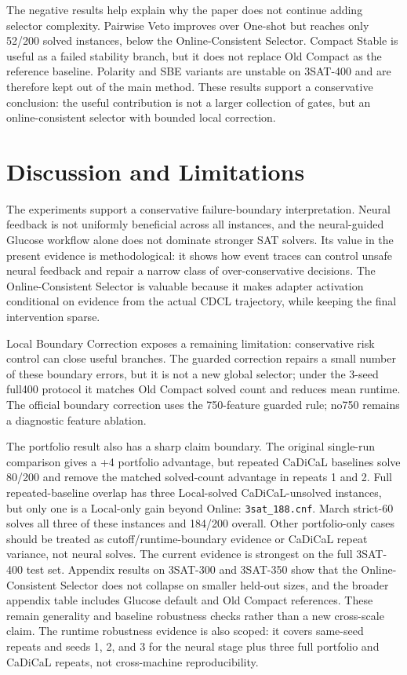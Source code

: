 \documentclass[11pt]{article}
\begin{document}
The negative results help explain why the paper does not continue adding selector complexity. Pairwise Veto improves over One-shot but reaches only 52/200 solved instances, below the Online-Consistent Selector. Compact Stable is useful as a failed stability branch, but it does not replace Old Compact as the reference baseline. Polarity and SBE variants are unstable on 3SAT-400 and are therefore kept out of the main method. These results support a conservative conclusion: the useful contribution is not a larger collection of gates, but an online-consistent selector with bounded local correction.

\section{Discussion and Limitations}

The experiments support a conservative failure-boundary interpretation. Neural feedback is not uniformly beneficial across all instances, and the neural-guided Glucose workflow alone does not dominate stronger SAT solvers. Its value in the present evidence is methodological: it shows how event traces can control unsafe neural feedback and repair a narrow class of over-conservative decisions. The Online-Consistent Selector is valuable because it makes adapter activation conditional on evidence from the actual CDCL trajectory, while keeping the final intervention sparse.

Local Boundary Correction exposes a remaining limitation: conservative risk control can close useful branches. The guarded correction repairs a small number of these boundary errors, but it is not a new global selector; under the 3-seed full400 protocol it matches Old Compact solved count and reduces mean runtime. The official boundary correction uses the 750-feature guarded rule; no750 remains a diagnostic feature ablation.

The portfolio result also has a sharp claim boundary. The original single-run comparison gives a +4 portfolio advantage, but repeated CaDiCaL baselines solve 80/200 and remove the matched solved-count advantage in repeats 1 and 2. Full repeated-baseline overlap has three Local-solved CaDiCaL-unsolved instances, but only one is a Local-only gain beyond Online: \texttt{3sat\_188.cnf}. March strict-60 solves all three of these instances and 184/200 overall. Other portfolio-only cases should be treated as cutoff/runtime-boundary evidence or CaDiCaL repeat variance, not neural solves. The current evidence is strongest on the full 3SAT-400 test set. Appendix results on 3SAT-300 and 3SAT-350 show that the Online-Consistent Selector does not collapse on smaller held-out sizes, and the broader appendix table includes Glucose default and Old Compact references. These remain generality and baseline robustness checks rather than a new cross-scale claim. The runtime robustness evidence is also scoped: it covers same-seed repeats and seeds 1, 2, and 3 for the neural stage plus three full portfolio and CaDiCaL repeats, not cross-machine reproducibility.
\end{document}
